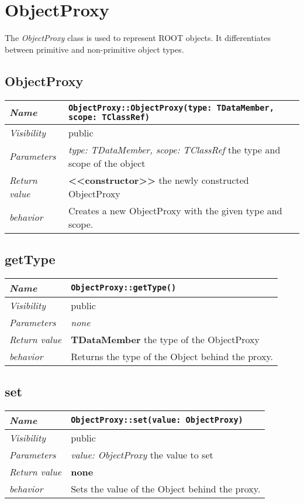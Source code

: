 \chapter{ObjectProxy}
The \textit{ObjectProxy} class is used to represent ROOT objects. It differentiates between primitive and non-primitive object types.
\section{ObjectProxy}
\begin{longtable}{p{3cm} @{\hskip 1cm} p{12cm}}
 \hline
\textit{Name} & \texttt{ObjectProxy::ObjectProxy(type: TDataMember, scope: TClassRef)}\\
\hline
 \textit{Visibility} & public\\
\hline
\textit{Parameters} & \textit{type: TDataMember, scope: TClassRef} the type and scope of the object\\
\hline
\textit{Return value} & \textbf{<<constructor>>} the newly constructed ObjectProxy\\
  \hline
  \textit{behavior} & Creates a new ObjectProxy with the given type and scope.\\
\hline
\end{longtable} \pagebreak
 \section{getType}
\begin{longtable}{p{3cm} @{\hskip 1cm} p{12cm}}
 \hline
\textit{Name} & \texttt{ObjectProxy::getType()}\\
\hline
 \textit{Visibility} & public\\
\hline
\textit{Parameters} & \textit{none}\\
\hline
\textit{Return value} & \textbf{TDataMember} the type of the ObjectProxy\\
  \hline
 \textit{behavior} & Returns the type of the Object behind the proxy.\\
\hline
\end{longtable} \pagebreak
 \section{set}
\begin{longtable}{p{3cm} @{\hskip 1cm} p{12cm}}
 \hline
\textit{Name} & \texttt{ObjectProxy::set(value: ObjectProxy)}\\
\hline
 \textit{Visibility} & public\\
\hline
\textit{Parameters} & \textit{value: ObjectProxy} the value to set\\
\hline
\textit{Return value} & \textbf{none}\\
  \hline
 \textit{behavior} & Sets the value of the Object behind the proxy.\\
\hline
\end{longtable} \pagebreak
